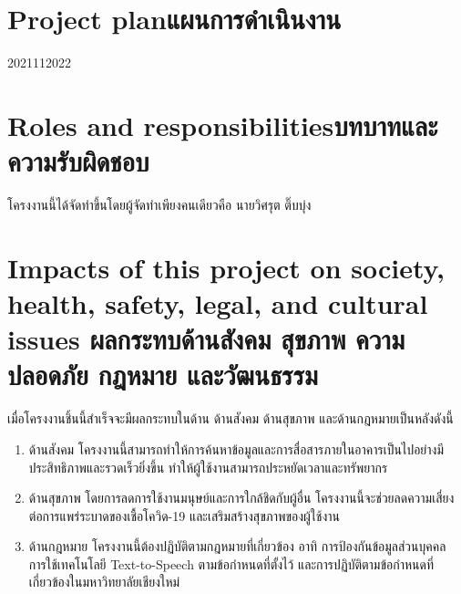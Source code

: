 \section{\ifenglish Project plan\else แผนการดำเนินงาน\fi}

\begin{plan}{11}{2021}{11}{2022}
\end{plan}

\section{\ifenglish Roles and responsibilities\else บทบาทและความรับผิดชอบ\fi}
โครงงานนี้ได้จัดทำขึ้นโดยผู้จัดทำเพียงคนเดียวคือ นายวิศรุต ติ๊บบุ่ง

\section{\ifenglish%
Impacts of this project on society, health, safety, legal, and cultural issues
\else%
ผลกระทบด้านสังคม สุขภาพ ความปลอดภัย กฎหมาย และวัฒนธรรม
\fi}
เมื่อโครงงานชิ้นนี้สำเร็จจะมีผลกระทบในด้าน ด้านสังคม ด้านสุขภาพ และด้านกฎหมายเป็นหลังดังนี้
\begin{enumerate}
    \item ด้านสังคม โครงงานนี้สามารถทำให้การค้นหาข้อมูลและการสื่อสารภายในอาคารเป็นไปอย่างมีประสิทธิภาพและรวดเร็วยิ่งขึ้น ทำให้ผู้ใช้งานสามารถประหยัดเวลาและทรัพยากร
    \item ด้านสุขภาพ โดยการลดการใช้งานมนุษย์และการใกล้ชิดกับผู้อื่น โครงงานนี้จะช่วยลดความเสี่ยงต่อการแพร่ระบาดของเชื้อโควิด-19 และเสริมสร้างสุขภาพของผู้ใช้งาน
    \item ด้านกฎหมาย โครงงานนี้ต้องปฏิบัติตามกฎหมายที่เกี่ยวข้อง อาทิ การป้องกันข้อมูลส่วนบุคคล การใช้เทคโนโลยี Text-to-Speech ตามข้อกำหนดที่ตั้งไว้ และการปฏิบัติตามข้อกำหนดที่เกี่ยวข้องในมหาวิทยาลัยเชียงใหม่
\end{enumerate}